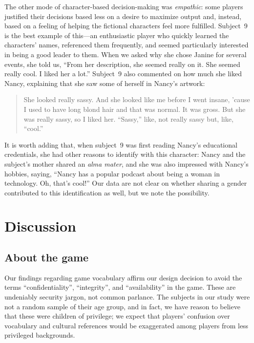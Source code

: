 \documentclass[letterpaper]{article}
\begin{document}
The other mode of character-based decision-making was \textit{empathic}:
some players justified their decisions based less on a desire to
maximize output and, instead, based on a feeling of helping the
fictional characters feel more fulfilled.
Subject~9 is the best example of this---an enthusiastic player
who quickly learned the characters' names, referenced them frequently,
and seemed particularly interested in being a good leader to them.
When we asked why she chose Janine for several events, she told us, 
``From her description, she seemed really on it. She seemed really cool.
I liked her a lot.'' 
Subject~9 also commented on how much she liked Nancy, explaining that
she saw some of herself in Nancy's artwork:
\begin{quote}
She looked really sassy. And she looked like me before
I went insane, 'cause I used to have long blond hair and that was
normal. It was gross. But she was really sassy, so I liked her.
``Sassy,'' like, not really sassy but, like, ``cool.''
\end{quote}
It is worth adding that, when subject~9 was first reading Nancy's 
educational credentials, she had other reasons to identify with
this character: Nancy and the subject's mother shared an \textit{alma mater},
and she was also impressed with Nancy's hobbies, saying, ``Nancy has a popular podcast about being a woman in technology. Oh, that's cool!'' 
Our data are not clear on whether sharing a gender contributed to this
identification as well, but we note the possibility.


\section{Discussion}
\label{sec:discussion}

\subsection{About the game}

Our findings regarding game vocabulary affirm our design decision
to avoid the terms ``confidentiality'', ``integrity'', and ``availability''
in the game. These are undeniably security jargon, not common parlance.
The subjects in our study were not a random sample of their age group,
and in fact, we have reason to believe that these were children of
privilege; we expect that players' confusion over vocabulary
and cultural references would be exaggerated among players from
less privileged backgrounds.
\end{document}
